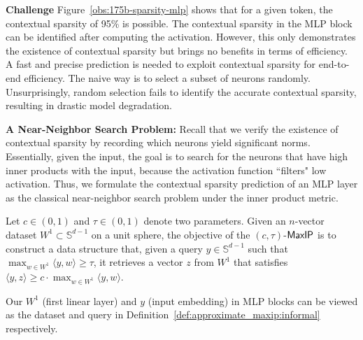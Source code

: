 \textbf{Challenge} Figure~\ref{obs:175b-sparsity-mlp} shows that for a given token, the contextual sparsity of 95\% is possible.  The contextual sparsity in the MLP block can be identified after computing the activation. However, this only demonstrates the existence of contextual sparsity but brings no benefits in terms of efficiency. A fast and precise prediction is needed to exploit contextual sparsity for end-to-end efficiency. The naive way is to select a subset of neurons randomly. Unsurprisingly, random selection fails to identify the accurate contextual sparsity, resulting in drastic model degradation. 

\textbf{A Near-Neighbor Search Problem:}  Recall that we verify the existence of contextual sparsity by recording which neurons yield significant norms. Essentially, given the input, the goal is to search for the neurons that have high inner products with the input, because the activation function ``filters" low activation. Thus, we formulate the contextual sparsity prediction of an MLP layer as the classical near-neighbor search problem under the inner product metric. 
\begin{definition}\label{def:approximate_maxip:informal}
Let $c \in (0,1)$ and $\tau \in (0,1)$ denote two parameters.
Given an $n$-vector dataset $W^1 \subset \mathbb{S}^{d-1}$ on a unit sphere, the objective of the $(c,\tau)$-{$\mathsf{MaxIP}$} is to construct a data structure that, given a query $y \in \mathbb{S}^{d-1}$ such that $\max_{w\in W^1}\langle y, w \rangle \geq \tau$, it retrieves a vector $z$ from $W^1$ that satisfies $\langle y, z \rangle \geq c \cdot \max_{w \in W^1} \langle y,w \rangle$.
\end{definition}

\begin{remark}
Our $W^1$ (first linear layer) and $y$ (input embedding) in MLP blocks can be viewed as the dataset and query  in Definition~\ref{def:approximate_maxip:informal}  respectively.
\end{remark}



